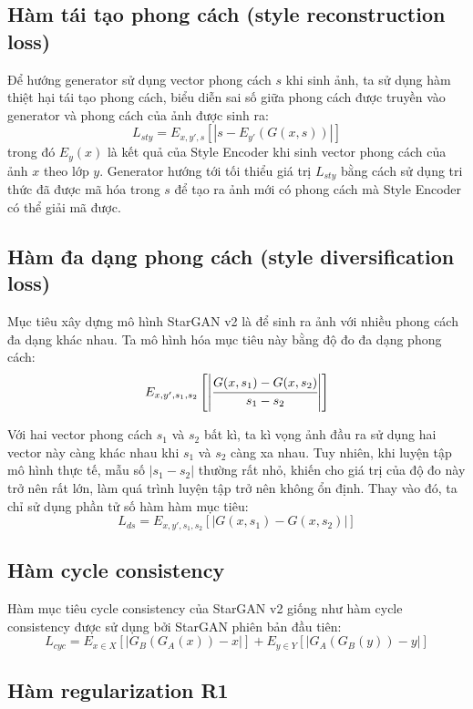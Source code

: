 \documentclass[12pt]{extreport}
\begin{document}
\subsection{Hàm tái tạo phong cách (style reconstruction loss)}

Để hướng generator sử dụng vector phong cách $ s $ khi sinh ảnh, ta sử dụng hàm thiệt hại tái tạo phong cách, biểu diễn sai số giữa phong cách được truyền vào generator và phong cách của ảnh được sinh ra:
$$ L_{sty} = E_{x,y',s} [|s - E_{y'}(G(x, s))|] $$
trong đó $ E_{y}(x) $ là kết quả của Style Encoder khi sinh vector phong cách của ảnh $ x $ theo lớp $ y $. Generator hướng tới tối thiểu giá trị $ L_{sty} $ bằng cách sử dụng tri thức đã được mã hóa trong $ s $ để tạo ra ảnh mới có phong cách mà Style Encoder có thể giải mã được.

\subsection{Hàm đa dạng phong cách (style diversification loss)}

Mục tiêu xây dựng mô hình StarGAN v2 là để sinh ra ảnh với nhiều phong cách đa dạng khác nhau. Ta mô hình hóa mục tiêu này bằng độ đo đa dạng phong cách:
$$ E_{x,y',s_1,s_2} \left[\left|\cfrac{G(x,s_1) - G(x,s_2)}{s_1 - s_2}\right|\right] $$

Với hai vector phong cách $ s_1 $ và $ s_2 $ bất kì, ta kì vọng ảnh đầu ra sử dụng hai vector này càng khác nhau khi $ s_1 $ và $ s_2 $ càng xa nhau. Tuy nhiên, khi luyện tập mô hình thực tế, mẫu số $ | s_1 - s_2 | $ thường rất nhỏ, khiến cho giá trị của độ đo này trở nên rất lớn, làm quá trình luyện tập trở nên không ổn định. Thay vào đó, ta chỉ sử dụng phần tử số hàm hàm mục tiêu:
$$ L_{ds} = E_{x,y',s_1,s_2} \left[\left|G(x,s_1) - G(x,s_2)\right|\right] $$

\subsection{Hàm cycle consistency}

Hàm mục tiêu cycle consistency của StarGAN v2 giống như hàm cycle consistency được sử dụng bởi StarGAN phiên bản đầu tiên:
$$ L_{cyc} = E_{x \in X} [|G_B(G_A(x)) - x|] + E_{y \in Y} [|G_A(G_B(y)) - y|] $$

\subsection{Hàm regularization R1}
\end{document}
